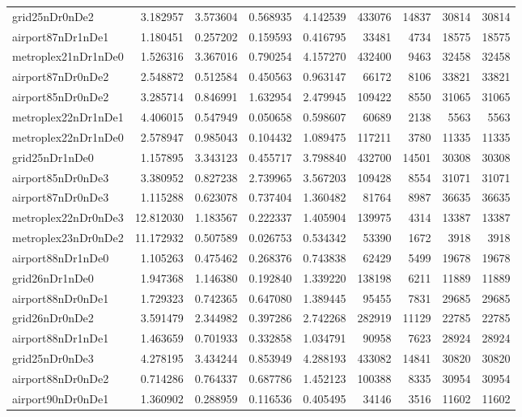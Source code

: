 \begin{longtable}{|l|r|r|r|r|r|r|r|r|}
grid25nDr0nDe2 & 3.182957 & 3.573604 & 0.568935 & 4.142539 & 433076 & 14837 & 30814 & 30814 \\
airport87nDr1nDe1 & 1.180451 & 0.257202 & 0.159593 & 0.416795 & 33481 & 4734 & 18575 & 18575 \\
metroplex21nDr1nDe0 & 1.526316 & 3.367016 & 0.790254 & 4.157270 & 432400 & 9463 & 32458 & 32458 \\
airport87nDr0nDe2 & 2.548872 & 0.512584 & 0.450563 & 0.963147 & 66172 & 8106 & 33821 & 33821 \\
airport85nDr0nDe2 & 3.285714 & 0.846991 & 1.632954 & 2.479945 & 109422 & 8550 & 31065 & 31065 \\
metroplex22nDr1nDe1 & 4.406015 & 0.547949 & 0.050658 & 0.598607 & 60689 & 2138 & 5563 & 5563 \\
metroplex22nDr1nDe0 & 2.578947 & 0.985043 & 0.104432 & 1.089475 & 117211 & 3780 & 11335 & 11335 \\
grid25nDr1nDe0 & 1.157895 & 3.343123 & 0.455717 & 3.798840 & 432700 & 14501 & 30308 & 30308 \\
airport85nDr0nDe3 & 3.380952 & 0.827238 & 2.739965 & 3.567203 & 109428 & 8554 & 31071 & 31071 \\
airport87nDr0nDe3 & 1.115288 & 0.623078 & 0.737404 & 1.360482 & 81764 & 8987 & 36635 & 36635 \\
metroplex22nDr0nDe3 & 12.812030 & 1.183567 & 0.222337 & 1.405904 & 139975 & 4314 & 13387 & 13387 \\
metroplex23nDr0nDe2 & 11.172932 & 0.507589 & 0.026753 & 0.534342 & 53390 & 1672 & 3918 & 3918 \\
airport88nDr1nDe0 & 1.105263 & 0.475462 & 0.268376 & 0.743838 & 62429 & 5499 & 19678 & 19678 \\
grid26nDr1nDe0 & 1.947368 & 1.146380 & 0.192840 & 1.339220 & 138198 & 6211 & 11889 & 11889 \\
airport88nDr0nDe1 & 1.729323 & 0.742365 & 0.647080 & 1.389445 & 95455 & 7831 & 29685 & 29685 \\
grid26nDr0nDe2 & 3.591479 & 2.344982 & 0.397286 & 2.742268 & 282919 & 11129 & 22785 & 22785 \\
airport88nDr1nDe1 & 1.463659 & 0.701933 & 0.332858 & 1.034791 & 90958 & 7623 & 28924 & 28924 \\
grid25nDr0nDe3 & 4.278195 & 3.434244 & 0.853949 & 4.288193 & 433082 & 14841 & 30820 & 30820 \\
airport88nDr0nDe2 & 0.714286 & 0.764337 & 0.687786 & 1.452123 & 100388 & 8335 & 30954 & 30954 \\
airport90nDr0nDe1 & 1.360902 & 0.288959 & 0.116536 & 0.405495 & 34146 & 3516 & 11602 & 11602 \\

\end{longtable}
